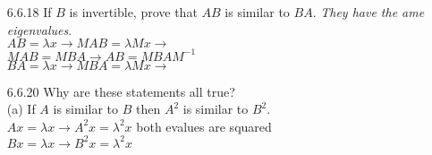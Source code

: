 \documentclass[10pt,twoside,reqno]{article}
\begin{document}
\begin{enumerate}
\vspace{3mm}
(c) $A$ can't be similar to $-A$ unless $A = 0$.\\
False
$
$$
\begin{bmatrix}
0 && 1\\
-1 && 0\\
\end{bmatrix}
$$
$
and
$
$$
\begin{bmatrix}
0 && -1\\
1 && 0\\
\end{bmatrix}
$$
$
are similar with $\lambda = -1, 1$\\
\vspace{3mm}
(d) $A$ can't be similar to $A + I$.\\
True, Adding $I$ increases the evalues by 1\\

\vspace{3mm}
\item[6.6.18] If $B$ is invertible, prove that $AB$ is similar to $BA$. \textit{They have the ame eigenvalues}.\\
$AB = \lambda x \rightarrow MAB = \lambda Mx \rightarrow$\\
\hspace{45mm} $MAB = MBA \rightarrow AB = MBAM^{-1}$\\
$BA = \lambda x \rightarrow MBA = \lambda Mx \rightarrow$\\

\vspace{3mm}
\item[6.6.20] Why are these statements all true?\\
(a) If $A$ is similar to $B$ then $A^2$ is similar to $B^2$.\\
$Ax = \lambda x \rightarrow A^2x = \lambda^2x$ both evalues are squared\\
$Bx = \lambda x \rightarrow B^2x = \lambda^2x$\\


\end{enumerate}
\end{document}
